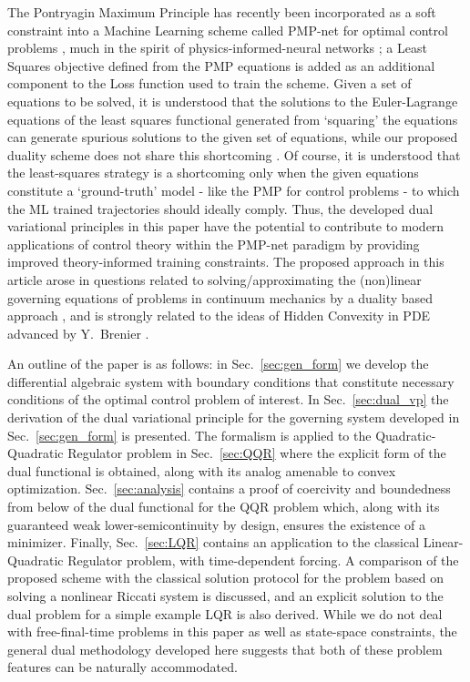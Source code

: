 \documentclass[11pt]{article}
\begin{document}
The Pontryagin Maximum Principle has recently been incorporated as a soft constraint into a Machine Learning scheme called PMP-net for optimal control problems  \cite{kamtue2024pontryagin}, much in the spirit of physics-informed-neural networks \cite{raissi2019physics}; a Least Squares objective defined from the PMP equations is added as an additional component to the Loss function used to train the scheme. Given a set of equations to be solved, it is understood that the solutions to the Euler-Lagrange equations of the least squares functional generated from `squaring' the equations can generate spurious solutions to the given set of equations, while our proposed duality scheme does not share this shortcoming \cite{action_2,sukumar2024variational}. Of course, it is understood that the least-squares strategy is a shortcoming only when the given equations constitute a `ground-truth' model - like the PMP for control problems - to which the ML trained trajectories should ideally comply. Thus, the developed dual variational principles in this paper have the potential to contribute to modern applications of control theory within the PMP-net paradigm by providing improved theory-informed training constraints. The proposed approach in this article arose in questions related to solving/approximating the (non)linear governing equations of problems in continuum mechanics by a duality based approach \cite{action_2,dual_cont_mech_plas,sga,KA1,KA2}, and is strongly related to the ideas of Hidden Convexity in PDE advanced by Y.~Brenier \cite{brenier2018initial, brenier_book}. 

An outline of the paper is as follows: in Sec.~\ref{sec:gen_form} we develop the differential algebraic system with boundary conditions that constitute necessary conditions of the optimal control problem of interest. In Sec.~\ref{sec:dual_vp} the derivation of the dual variational principle for the governing system developed in Sec.~\ref{sec:gen_form} is presented. The formalism is applied to the Quadratic-Quadratic Regulator problem in Sec.~\ref{sec:QQR} where the explicit form of the dual functional is obtained, along with its analog amenable to convex optimization. Sec.~\ref{sec:analysis} contains a proof of coercivity and boundedness from below of the dual functional for the QQR problem which, along with its guaranteed weak lower-semicontinuity by design, ensures the existence of a minimizer. Finally, Sec.~\ref{sec:LQR} contains an application to the classical Linear-Quadratic Regulator problem, with time-dependent forcing. A comparison of the proposed scheme with the classical solution protocol for the problem based on solving a nonlinear Riccati system is discussed, and an explicit solution to the dual problem for a simple example LQR is also derived. While we do not deal with free-final-time problems in this paper as well as state-space constraints, the general dual methodology developed here suggests that both of these problem features can be naturally accommodated.
\end{document}
